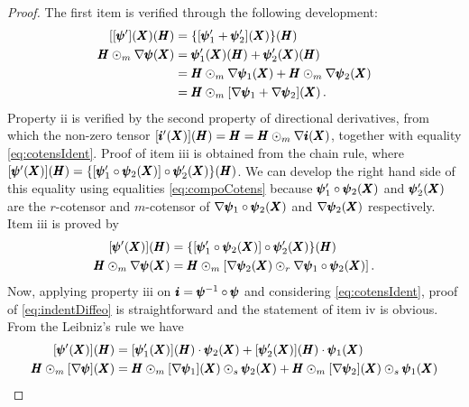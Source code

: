{\footnotesize
\begin{proof}
The first item is verified through the following development:
\begin{align*}
[[\pmb{\psi}'](\pmb{X})(\pmb{H})&=\{[\pmb{\psi}'_1+\pmb{\psi}'_2](\pmb{X})\}(\pmb{H})\\
\pmb{H}\odot_m\nabla\pmb{\psi}(\pmb{X})&=\pmb{\psi}'_1(\pmb{X})(\pmb{H})+\pmb{\psi}'_2(\pmb{X})(\pmb{H})\\
&=\pmb{H}\odot_m\nabla\pmb{\psi}_1(\pmb{X})+\pmb{H}\odot_m\nabla\pmb{\psi}_2(\pmb{X})\\
&=\pmb{H}\odot_m[\nabla\pmb{\psi}_1+\nabla\pmb{\psi}_2](\pmb{X})\,.
\end{align*}	
Property ii is verified by the second property of directional derivatives, from which the non-zero tensor $[\pmb{i}'(\pmb{X})](\pmb{H})=\pmb{H}=\pmb{H}\odot_m\nabla\pmb{i}(\pmb{X})$, together with equality \eqref{eq:cotensIdent}. Proof of item iii is obtained from the chain rule, where $[\pmb{\psi}'(\pmb{X})](\pmb{H})=\{[\pmb{\psi}_1'\circ\pmb{\psi}_2(\pmb{X})]\circ\pmb{\psi}_2'(\pmb{X})\}(\pmb{H})$. We can develop the right hand side of this equality using equalities \eqref{eq:compoCotens} because
$\pmb{\psi}_1'\circ\pmb{\psi}_2(\pmb{X})$ and $\pmb{\psi}_2'(\pmb{X})$ are the $r$-cotensor and $m$-cotensor of $\nabla\pmb{\psi}_1\circ\pmb{\psi}_2(\pmb{X})$ and $\nabla\pmb{\psi}_2(\pmb{X})$ respectively. Item iii is proved by
\begin{align*}
[\pmb{\psi}'(\pmb{X})](\pmb{H})&=\{[\pmb{\psi}_1'\circ\pmb{\psi}_2(\pmb{X})]\circ\pmb{\psi}_2'(\pmb{X})\}(\pmb{H})\\
\pmb{H}\odot_m\nabla\pmb{\psi}(\pmb{X})&=\pmb{H}\odot_m[\nabla\pmb{\psi}_2(\pmb{X})\odot_r\nabla\pmb{\psi}_1\circ\pmb{\psi}_2(\pmb{X})]\,.
\end{align*}
Now, applying property iii on $\pmb{i}=\pmb{\psi}^{-1}\circ\pmb{\psi}$ and considering \eqref{eq:cotensIdent}, proof of \eqref{eq:indentDiffeo} is straightforward and the statement of item iv is obvious. From the Leibniz's rule we have
\begin{align*}
\fua{[\fua{\tnr{\psi}'}{\tnr{X}}]}{\tnr{H}}&=\fua{[\fua{\tnr{\psi}_1'}{\tnr{X}}]}{\tnr{H}} \cdot \fua{\tnr{\psi}_2}{\tnr{X}}+\fua{[\fua{\tnr{\psi}_2'}{\tnr{X}}]}{\tnr{H}}\cdot\fua{\tnr{\psi}_1}{\tnr{X}}\\
\tnr{H}\odot_m\fua{[\nabla\tnr{\psi}]}{\tnr{X}}&=\tnr{H}\odot_m\fua{[\nabla\tnr{\psi}_1]}{\tnr{X}}\odot_s\fua{\tnr{\psi}_2}{\tnr{X}}+\tnr{H}\odot_m\fua{[\nabla\tnr{\psi}_2]}{\tnr{X}}\odot_s\fua{\tnr{\psi}_1}{\tnr{X}}\\

\end{align*}
\end{proof}}
